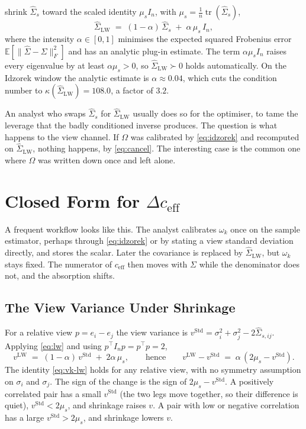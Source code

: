 \documentclass[a4paper,11pt]{article}
\theoremstyle{plain}
\theoremstyle{definition}
\newcommand{\E}{\mathbb{E}}
\newcommand{\Std}{\mathrm{Std}}
\newcommand{\LW}{\mathrm{LW}}
\newcommand{\eff}{\mathrm{eff}}
\begin{document}
\citet{LedoitWolf2004} shrink $\hat\Sigma_s$ toward the scaled identity
$\mu_s I_n$, with $\mu_s = \tfrac{1}{n}\operatorname{tr}(\hat\Sigma_s)$,
\begin{equation}
\label{eq:lw}
  \hat\Sigma_{\LW} \;=\; (1 - \alpha)\,\hat\Sigma_s \;+\; \alpha\,\mu_s\,I_n ,
\end{equation}
where the intensity $\alpha \in [0,1]$ minimises the expected squared Frobenius
error $\E[\|\hat\Sigma - \Sigma\|_F^2]$ and has an analytic plug-in estimate. The
term $\alpha\mu_s I_n$ raises every eigenvalue by at least $\alpha\mu_s > 0$, so
$\hat\Sigma_{\LW} \succ 0$ holds automatically. On the Idzorek window the analytic
estimate is $\alpha \approx 0.04$, which cuts the condition number to
$\kappa(\hat\Sigma_{\LW}) = 108.0$, a factor of $3.2$.

An analyst who swaps $\hat\Sigma_s$ for $\hat\Sigma_{\LW}$ usually does so for the
optimiser, to tame the leverage that the badly conditioned inverse produces. The
question is what happens to the view channel. If $\Omega$ was calibrated by
\eqref{eq:idzorek} and recomputed on $\hat\Sigma_{\LW}$, nothing happens, by
\eqref{eq:cancel}. The interesting case is the common one where $\Omega$ was
written down once and left alone.

\section{Closed Form for $\Delta c_{\eff}$}
\label{sec:dceff}

A frequent workflow looks like this. The analyst calibrates $\omega_k$ once on
the sample estimator, perhaps through \eqref{eq:idzorek} or by stating a view
standard deviation directly, and stores the scalar. Later the covariance is
replaced by $\hat\Sigma_{\LW}$, but $\omega_k$ stays fixed. The numerator of
$c_{\eff}$ then moves with $\Sigma$ while the denominator does not, and the
absorption shifts.

\subsection{The View Variance Under Shrinkage}
\label{sec:vk-shift}

For a relative view $p = e_i - e_j$ the view variance is
$v^\Std = \sigma_i^2 + \sigma_j^2 - 2\hat\Sigma_{s,ij}$. Applying \eqref{eq:lw}
and using $p^\top I_n p = p^\top p = 2$,
\begin{equation}
\label{eq:vk-lw}
  v^\LW \;=\; (1 - \alpha)\,v^\Std \;+\; 2\alpha\,\mu_s ,
  \qquad\text{hence}\qquad
  v^\LW - v^\Std \;=\; \alpha\,(2\mu_s - v^\Std) .
\end{equation}
The identity \eqref{eq:vk-lw} holds for any relative view, with no symmetry
assumption on $\sigma_i$ and $\sigma_j$. The sign of the change is the sign of
$2\mu_s - v^\Std$. A positively correlated pair has a small $v^\Std$ (the two
legs move together, so their difference is quiet), $v^\Std < 2\mu_s$, and
shrinkage raises $v$. A pair with low or negative correlation has a large
$v^\Std > 2\mu_s$, and shrinkage lowers $v$.
\end{document}
